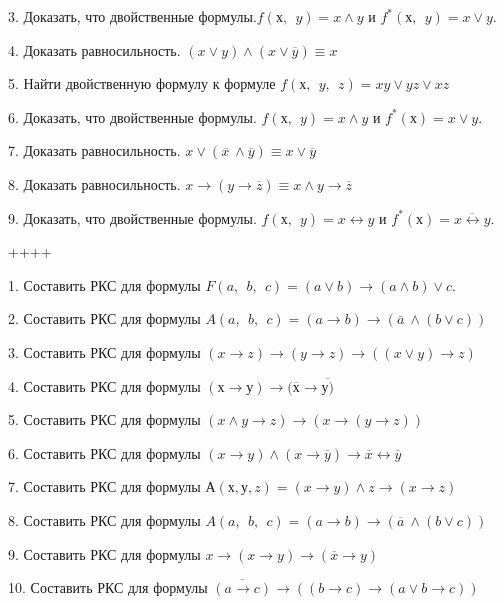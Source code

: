 3. Доказать, что двойственные формулы.\(f(х,\ \ y) = x \land y\) и \(f^{*}(х,\ \ y) = x \vee y.\)

4. Доказать равносильность. \((x \vee y) \land (x \vee \overline{y}) \equiv x\)

5. Найти двойственную формулу к формуле \(f(х,\ \ y,\ \ z) = xy \vee yz \vee xz\)

6. Доказать, что двойственные формулы. \(f(х,\ \ y) = x \land y\) и \(f^{*}(х) = x \vee y.\)

7. Доказать равносильность. \(x \vee \left( \overline{x\ } \land \overline{y} \right) \equiv x \vee \overline{y}\)

8. Доказать равносильность. \(x \rightarrow \left( y \rightarrow \overline{z} \right) \equiv x \land y \rightarrow \overline{z}\)

9. Доказать, что двойственные формулы. \(f(х,\ \ y) = x \leftrightarrow y\) и \(f^{*}(х) = \overline{x \leftrightarrow y}.\)

++++

1. Составить РКС для формулы \(F(a,\ \ b,\ \ c) = (a \vee b) \rightarrow (a \land b) \vee c.\)

2. Составить РКС для формулы \(A(a,\ \ b,\ \ c) = (a \rightarrow b) \rightarrow (\overline{a}\  \land (b \vee c))\)

3. Составить РКС для формулы \((x \rightarrow z) \rightarrow (y \rightarrow z) \rightarrow ((x \vee y) \rightarrow z)\)

4. Составить РКС для формулы \((х \rightarrow у) \rightarrow (\overline{х} \rightarrow \overline{у)}\)

5. Составить РКС для формулы \((x \land y \rightarrow z) \rightarrow (x \rightarrow (y \rightarrow z))\)

6. Составить РКС для формулы \((x \rightarrow y) \land (x \rightarrow \overline{y}) \rightarrow \overline{x} \leftrightarrow \overline{y}\)

7. Составить РКС для формулы \(А(х,у,z) = (x \rightarrow y) \land z \rightarrow (x \rightarrow z)\)

8. Составить РКС для формулы \(A(a,\ \ b,\ \ c) = (a \rightarrow b) \rightarrow (\overline{a}\  \land (b \vee c))\)

9. Составить РКС для формулы \(x \rightarrow (x \rightarrow y) \rightarrow (\overline{x} \rightarrow y)\ \)

10. Составить РКС для формулы \(\overline{(a \rightarrow c)} \rightarrow \left( (b \rightarrow c) \rightarrow (a \vee b \rightarrow c) \right)\)

